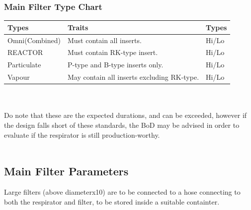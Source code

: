 \documentclass[a4paper, 12pt, oneside]{article}
\begin{document}
{			\subsubsection{Main Filter Type Chart}
				\begin{tabular}{|p{3cm}||p{8.44cm}|p{1cm}|}
					\hline
					Types & Traits & Types \\\hline
					Omni(Combined) & Must contain all inserts. & Hi/Lo \\
					REACTOR & Must contain RK-type insert. & Hi/Lo \\
					Particulate & P-type and B-type inserts only. & Hi/Lo \\
					Vapour & May contain all inserts excluding RK-type. & Hi/Lo \\\hline	
				\end{tabular} \\ \-\\
				\small *Do note that these are the expected durations, and can be exceeded, however if the design falls short of these standards, the BoD may be advised in order to evaluate if the respirator is still production-worthy. \normalsize \\ \-\\	
		\subsection{Main Filter Parameters}
			Large filters (above diameterx10) are to be connected to a hose connecting to both the respirator and filter, to be stored inside a suitable containter. \\ \-\\
}
\end{document}
